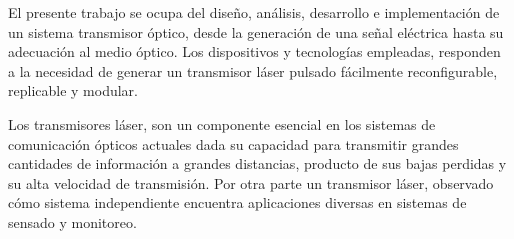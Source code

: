 


\begin{abstracts}        %

    El presente trabajo se ocupa del diseño, análisis, desarrollo e implementación de un sistema transmisor óptico, desde la generación de una señal eléctrica hasta su adecuación al medio óptico.
    Los dispositivos y tecnologías empleadas, responden a la necesidad de generar un transmisor láser pulsado
    fácilmente reconfigurable, replicable y modular.

    Los transmisores láser, son un componente esencial en los sistemas de comunicación ópticos actuales dada su capacidad
    para transmitir grandes cantidades de información a grandes distancias, producto de sus bajas perdidas y su alta velocidad de transmisión.
    Por otra parte un transmisor láser, observado cómo sistema independiente encuentra aplicaciones diversas
    en sistemas de sensado y monitoreo.






    
    

\end{abstracts}



